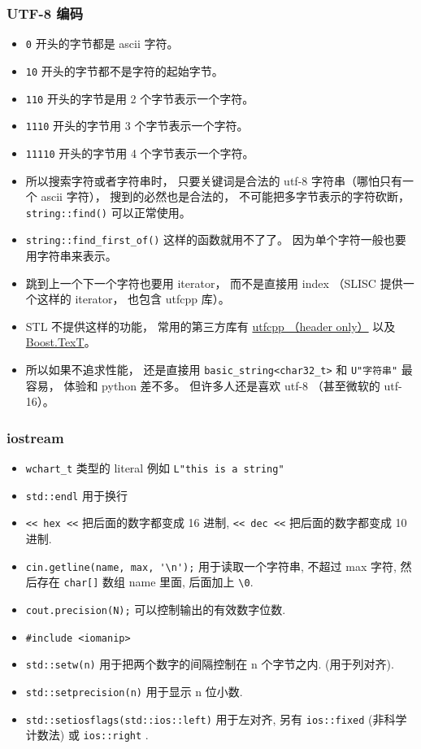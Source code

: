 \subsubsection{UTF-8 编码}
\begin{itemize}
\item \verb|0| 开头的字节都是 ascii 字符。
\item \verb|10| 开头的字节都不是字符的起始字节。
\item \verb|110| 开头的字节是用 2 个字节表示一个字符。
\item \verb|1110| 开头的字节用 3 个字节表示一个字符。
\item \verb|11110| 开头的字节用 4 个字节表示一个字符。
\item 所以搜索字符或者字符串时， 只要关键词是合法的 utf-8 字符串（哪怕只有一个 ascii 字符）， 搜到的必然也是合法的， 不可能把多字节表示的字符砍断， \verb|string::find()| 可以正常使用。
\item \verb|string::find_first_of()| 这样的函数就用不了了。 因为单个字符一般也要用字符串来表示。
\item 跳到上一个下一个字符也要用 iterator， 而不是直接用 index （SLISC 提供一个这样的 iterator， 也包含 utfcpp 库）。
\item STL 不提供这样的功能， 常用的第三方库有 \href{https://github.com/nemtrif/utfcpp}{utfcpp （header only）} 以及 \href{https://tzlaine.github.io/text/doc/html/index.html}{Boost.TexT}。
\item 所以如果不追求性能， 还是直接用 \verb|basic_string<char32_t>| 和 \verb|U"字符串"| 最容易， 体验和 python 差不多。 但许多人还是喜欢 utf-8 （甚至微软的 utf-16）。
\end{itemize}


\subsubsection{iostream}
\begin{itemize}
\item \verb`wchart_t` 类型的 literal 例如 \verb`L"this is a string"`
\item \verb`std::endl` 用于换行
\item \verb`<< hex <<` 把后面的数字都变成 16 进制, \verb`<< dec <<` 把后面的数字都变成 10 进制.
\item \verb`cin.getline(name, max, '\n');` 用于读取一个字符串, 不超过 max 字符, 然后存在 \verb`char[]` 数组 name 里面, 后面加上 \verb`\0`.
\item \verb`cout.precision(N);` 可以控制输出的有效数字位数.

\item \verb`#include <iomanip>`
\item \verb`std::setw(n)` 用于把两个数字的间隔控制在 n 个字节之内. (用于列对齐).
\item \verb`std::setprecision(n)` 用于显示 n 位小数.
\item \verb`std::setiosflags(std::ios::left)` 用于左对齐, 另有 \verb`ios::fixed` (非科学计数法) 或 \verb`ios::right` .
\end{itemize}

